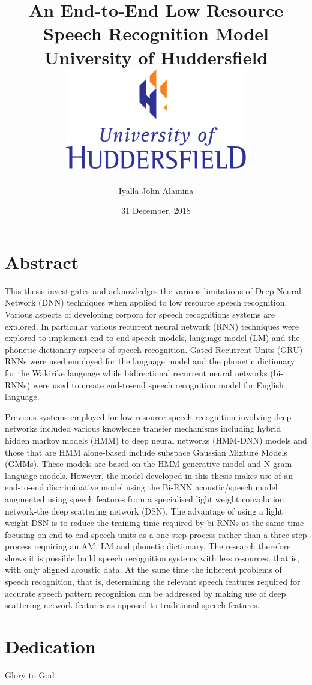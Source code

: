 \documentclass[12pt,twoside]{report}
\title{
    {An End-to-End Low Resource Speech Recognition Model}\\
    {\large University of Huddersfield}\\
    {\includegraphics{university.png}}
}
\author{Iyalla John Alamina}
\date{31 December, 2018}
\begin{document}
\maketitle
{}

\chapter*{Abstract}
This thesis investigates and acknowledges the various limitations of Deep Neural Network (DNN) techniques when applied to low resource speech recognition.   Various aspects of developing corpora for speech recognitions systems are explored.  In particular various recurrent neural network (RNN) techniques were explored to implement end-to-end speech models, language model (LM) and the phonetic dictionary aspects of speech recognition. Gated Recurrent Units (GRU) RNNs were used employed for the language model and the phonetic dictionary for the Wakirike language while bidirectional recurrent neural networks (bi-RNNs) were used to create end-to-end speech recognition model for English language.

Previous systems employed for low resource speech recognition involving deep networks included various knowledge transfer mechanisms including hybrid hidden markov models (HMM) to deep neural networks (HMM-DNN) models and those that are HMM alone-based include subspace Gaussian Mixture Models (GMMs).   These models are based on the HMM generative model and N-gram language models.  However, the model developed in this thesis makes use of an end-to-end discriminative model using the Bi-RNN acoustic/speech model augmented using speech features from a specialised light weight convolution network-the deep scattering network (DSN).  The advantage of using a light weight DSN is to reduce the training time required by  bi-RNNs at the same time focusing on end-to-end speech units as a one step process rather than a three-step process requiring an AM, LM and phonetic dictionary. The research therefore shows it is possible build speech recognition systems with less resources, that is, with only aligned acoustic data.  At the same time the inherent problems of speech recognition, that is, determining the relevant speech features required for accurate speech pattern recognition can be addressed by making use of deep scattering network features as opposed to traditional speech features. 

\chapter*{Dedication}
Glory to God
\end{document}

